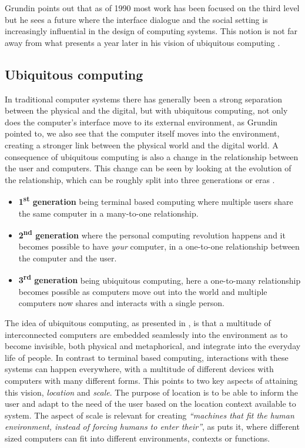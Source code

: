 Grundin points out that as of 1990 most work has been focused on the third level but he sees a future where the interface dialogue and the social setting is increasingly influential in the design of computing systems.
This notion is not far away from what \citeauthor{weiser1991computer} presents a year later in his vision of ubiquitous computing \citep{weiser1991computer}.

\subsection{Ubiquitous computing}
In traditional computer systems there has generally been a strong separation between the physical and the digital, but with ubiquitous computing, not only does the computer's interface move to its external environment, as Grundin pointed to, we also see that the computer itself moves into the environment, creating a stronger link between the physical world and the digital world.
A consequence of ubiquitous computing is also a change in the relationship between the user and computers.
This change can be seen by looking at the evolution of the relationship, which can be roughly split into three generations or eras \citep{weiser1997coming,abowd2012next}.
\begin{itemize}
\item[] \textbf{1\textsuperscript{st} generation} being terminal based computing where multiple users share the same computer in a many-to-one relationship.
\item[] \textbf{2\textsuperscript{nd} generation} where the personal computing revolution happens and it becomes possible to have \emph{your} computer, in a one-to-one relationship between the computer and the user.
\item[] \textbf{3\textsuperscript{rd} generation} being ubiquitous computing, here a one-to-many relationship becomes possible as computers move out into the world and multiple computers now shares and interacts with a single person.
\end{itemize}

The idea of ubiquitous computing, as presented in \citep{weiser1991computer}, is that a multitude of interconnected computers are embedded seamlessly into the environment as to become invisible, both physical and metaphorical, and integrate into the everyday life of people.
In contrast to terminal based computing, interactions with these systems can happen everywhere, with a multitude of different devices with computers with many different forms. 
This points to two key aspects of attaining this vision, \emph{location} and \emph{scale}.
The purpose of location is to be able to inform the user and adapt to the need of the user based on the location context available to system. 
The aspect of scale is relevant for creating \emph{``machines that fit the human environment, instead of
forcing humans to enter their''}, as \citeauthor{weiser1991computer} puts it, where different sized computers can fit into different environments, contexts or functions. 

